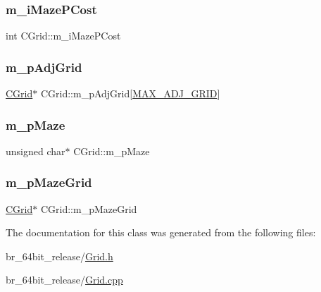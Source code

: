 \mbox{\label{classCGrid_a1bf1fef7c4ac3f2b3b63bf3c70e0b876}} 
\subsubsection{\texorpdfstring{m\_iMazePCost}{m\_iMazePCost}}
{\footnotesize\ttfamily int C\+Grid\+::m\+\_\+i\+Maze\+P\+Cost}

\mbox{\label{classCGrid_a95af50152ecab2a3b8c1c58a4cd1f854}} 
\subsubsection{\texorpdfstring{m\_pAdjGrid}{m\_pAdjGrid}}
{\footnotesize\ttfamily \mbox{\hyperlink{classCGrid}{C\+Grid}}$\ast$ C\+Grid\+::m\+\_\+p\+Adj\+Grid\mbox{[}\mbox{\hyperlink{BoxRouter_8h_a128a23fb1a65ac37f6c65d9ce0e6beeb}{M\+A\+X\+\_\+\+A\+D\+J\+\_\+\+G\+R\+ID}}\mbox{]}\hspace{0.3cm}{\ttfamily [protected]}}

\mbox{\label{classCGrid_afcbc0f78cba690a48e1db6e54365acd9}} 
\subsubsection{\texorpdfstring{m\_pMaze}{m\_pMaze}}
{\footnotesize\ttfamily unsigned char$\ast$ C\+Grid\+::m\+\_\+p\+Maze\hspace{0.3cm}{\ttfamily [protected]}}

\mbox{\label{classCGrid_aa46a2d46372fef4d8ac13c61f575ea89}} 
\subsubsection{\texorpdfstring{m\_pMazeGrid}{m\_pMazeGrid}}
{\footnotesize\ttfamily \mbox{\hyperlink{classCGrid}{C\+Grid}}$\ast$ C\+Grid\+::m\+\_\+p\+Maze\+Grid\hspace{0.3cm}{\ttfamily [protected]}}



The documentation for this class was generated from the following files\+:\begin{DoxyCompactItemize}
\item 
br\+\_\+64bit\+\_\+release/\mbox{\hyperlink{Grid_8h}{Grid.\+h}}\item 
br\+\_\+64bit\+\_\+release/\mbox{\hyperlink{Grid_8cpp}{Grid.\+cpp}}\end{DoxyCompactItemize}
